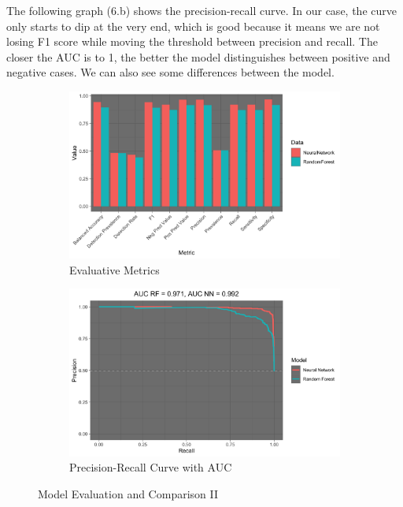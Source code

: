 \documentclass[
]{report}
\begin{document}
The following graph (6.b) shows the precision-recall curve. In our case,
the curve only starts to dip at the very end, which is good because it
means we are not losing F1 score while moving the threshold between
precision and recall. The closer the AUC is to 1, the better the model
distinguishes between positive and negative cases. We can also see some
differences between the model.

\begin{figure}[h]
    \begin{subfigure}{0.45\textwidth} %
        \centering
        \includegraphics[width=\textwidth]{images/NNRF1.png}
        \caption{Evaluative Metrics}
        \label{fig:scree_plot}
    \end{subfigure}
    \hfill %
    \begin{subfigure}{0.45\textwidth} %
        \centering
        \includegraphics[width=\textwidth]{images/NNRF3.png}
        \caption{Precision-Recall Curve with AUC}
        \label{fig:pca_result}
    \end{subfigure}
    \caption{Model Evaluation and Comparison II}
    \label{fig:pca_combined}
\end{figure}
\end{document}

